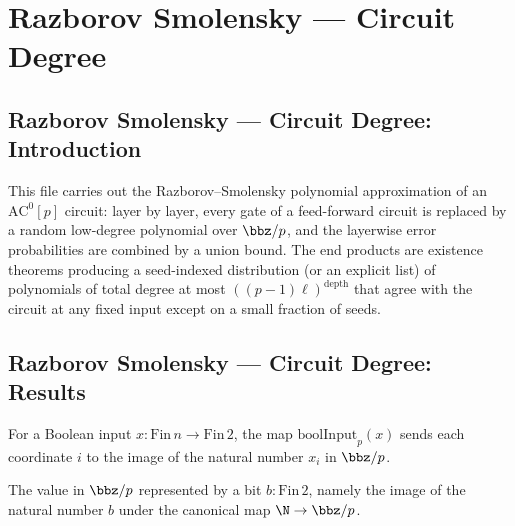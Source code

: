\section{Razborov Smolensky --- Circuit Degree}
\subsection*{Razborov Smolensky --- Circuit Degree: Introduction}

This file carries out the Razborov--Smolensky polynomial approximation of an
$\mathrm{AC}^0[p]$ circuit: layer by layer, every gate of a feed-forward circuit is replaced by a
random low-degree polynomial over $\bbz/p$, and the layerwise error probabilities are combined by a
union bound.  The end products are existence theorems producing a seed-indexed distribution (or an
explicit list) of polynomials of total degree at most $((p-1)\ell)^{\mathrm{depth}}$ that agree with
the circuit at any fixed input except on a small fraction of seeds.

\subsection*{Razborov Smolensky --- Circuit Degree: Results}

\begin{definition}
\label{RazborovSmolensky.boolInput}
\leanok
For a Boolean input $x : \mathrm{Fin}\,n \to \mathrm{Fin}\,2$, the map
$\mathrm{boolInput}_p(x)$ sends each coordinate $i$ to the image of the natural number $x_i$ in
$\bbz/p$.
\end{definition}

\begin{definition}
\label{RazborovSmolensky.boolVal}
\leanok
The value in $\bbz/p$ represented by a bit $b : \mathrm{Fin}\,2$, namely the image of the natural
number $b$ under the canonical map $\N \to \bbz/p$.
\end{definition}

